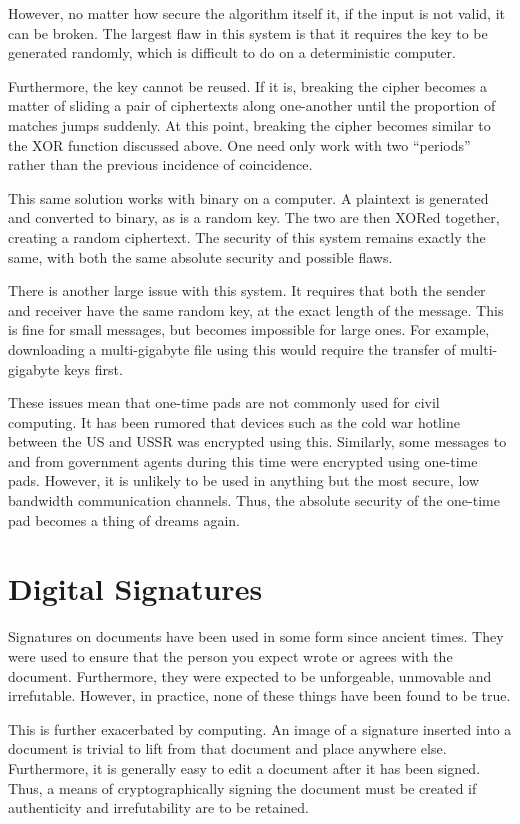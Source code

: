 		However, no matter how secure the algorithm itself it, if the input is not valid, it can be broken. 
		The largest flaw in this system is that it requires the key to be generated randomly, which is difficult to do on a deterministic computer. 
		
		Furthermore, the key cannot be reused. 
		If it is, breaking the cipher becomes a matter of sliding a pair of ciphertexts along one-another until the proportion of matches jumps suddenly. 
		At this point, breaking the cipher becomes similar to the XOR function discussed above. 
		One need only work with two ``periods'' rather than the previous incidence of coincidence. 

		This same solution works with binary on a computer. 
		A plaintext is generated and converted to binary, as is a random key.  
		The two are then XORed together, creating a random ciphertext. 
		The security of this system remains exactly the same, with both the same absolute security and possible flaws. 

		There is another large issue with this system. 
		It requires that both the sender and receiver have the same random key, at the exact length of the message. 
		This is fine for small messages, but becomes impossible for large ones. 
		For example, downloading a multi-gigabyte file using this would require the transfer of multi-gigabyte keys first. 

		These issues mean that one-time pads are not commonly used for civil computing. 
		It has been rumored that devices such as the cold war hotline between the US and USSR was encrypted using this. 
		Similarly, some messages to and from government agents during this time were encrypted using one-time pads. 
		However, it is unlikely to be used in anything but the most secure, low bandwidth communication channels. 
		Thus, the absolute security of the one-time pad becomes a thing of dreams again. 
	\section{Digital Signatures}
		Signatures on documents have been used in some form since ancient times. 
		They were used to ensure that the person you expect wrote or agrees with the document. 
		Furthermore, they were expected to be unforgeable, unmovable and irrefutable. 
		However, in practice, none of these things have been found to be true. 

		This is further exacerbated by computing. 
		An image of a signature inserted into a document is trivial to lift from that document and place anywhere else. 
		Furthermore, it is generally easy to edit a document after it has been signed. 
		Thus, a means of cryptographically signing the document must be created if authenticity and irrefutability are to be retained. 

